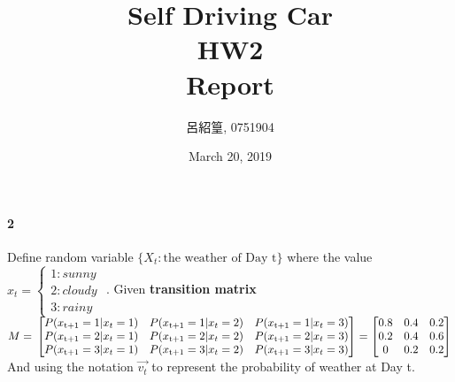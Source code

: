 \documentclass[12pt,a4paper]{article}
\title{Self Driving Car \\HW2 \\ Report}
\date{March 20, 2019}
\author{呂紹篁, 0751904}
\begin{document}
\thispagestyle{plain}
\cfoot{}
\maketitle
\paragraph{2}
Define random variable $\{X_t: \text{the weather of Day t}\}$ where the value $x_t=\begin{cases} 1: sunny \\ 2: cloudy \\ 3: rainy \end{cases}$ .
Given \textbf{transition matrix} $M = \\
\begin{bmatrix}
P(x_\text{t+1}=1|x_t=1) & P(x_\text{t+1}=1|x_t=2) & P(x_\text{t+1}=1|x_t=3) \\
P(x_\text{t+1}=2|x_t=1) & P(x_\text{t+1}=2|x_t=2) & P(x_\text{t+1}=2|x_t=3) \\
P(x_\text{t+1}=3|x_t=1) & P(x_\text{t+1}=3|x_t=2) & P(x_\text{t+1}=3|x_t=3) 
\end{bmatrix} =
			     \begin{bmatrix}
			      0.8 & 0.4 & 0.2 \\
                              0.2 & 0.4 & 0.6 \\
                              0   & 0.2 & 0.2
                             \end{bmatrix}$ \\
And using the notation $\overrightarrow{v_t}$ to represent the probability of weather at Day t.
\end{document}
